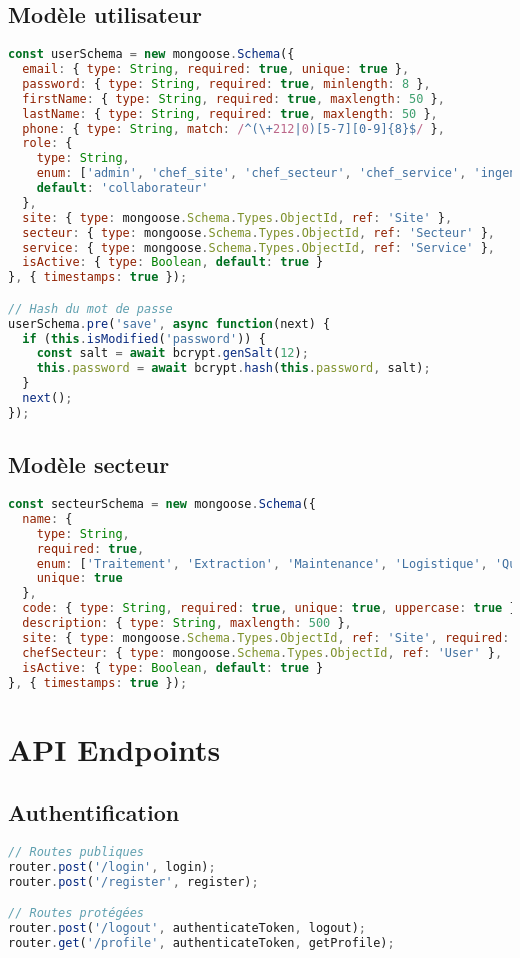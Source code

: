 \subsection{Modèle utilisateur}
\begin{lstlisting}[language=JavaScript, caption=Modèle utilisateur simplifié]
const userSchema = new mongoose.Schema({
  email: { type: String, required: true, unique: true },
  password: { type: String, required: true, minlength: 8 },
  firstName: { type: String, required: true, maxlength: 50 },
  lastName: { type: String, required: true, maxlength: 50 },
  phone: { type: String, match: /^(\+212|0)[5-7][0-9]{8}$/ },
  role: { 
    type: String, 
    enum: ['admin', 'chef_site', 'chef_secteur', 'chef_service', 'ingenieur', 'collaborateur'],
    default: 'collaborateur' 
  },
  site: { type: mongoose.Schema.Types.ObjectId, ref: 'Site' },
  secteur: { type: mongoose.Schema.Types.ObjectId, ref: 'Secteur' },
  service: { type: mongoose.Schema.Types.ObjectId, ref: 'Service' },
  isActive: { type: Boolean, default: true }
}, { timestamps: true });

// Hash du mot de passe
userSchema.pre('save', async function(next) {
  if (this.isModified('password')) {
    const salt = await bcrypt.genSalt(12);
    this.password = await bcrypt.hash(this.password, salt);
  }
  next();
});
\end{lstlisting}

\subsection{Modèle secteur}
\begin{lstlisting}[language=JavaScript, caption=Modèle secteur simplifié]
const secteurSchema = new mongoose.Schema({
  name: { 
    type: String, 
    required: true, 
    enum: ['Traitement', 'Extraction', 'Maintenance', 'Logistique', 'Qualité'],
    unique: true 
  },
  code: { type: String, required: true, unique: true, uppercase: true },
  description: { type: String, maxlength: 500 },
  site: { type: mongoose.Schema.Types.ObjectId, ref: 'Site', required: true },
  chefSecteur: { type: mongoose.Schema.Types.ObjectId, ref: 'User' },
  isActive: { type: Boolean, default: true }
}, { timestamps: true });
\end{lstlisting}

\section{API Endpoints}
\subsection{Authentification}
\begin{lstlisting}[language=JavaScript, caption=Routes d'authentification]
// Routes publiques
router.post('/login', login);
router.post('/register', register);

// Routes protégées
router.post('/logout', authenticateToken, logout);
router.get('/profile', authenticateToken, getProfile);
\end{lstlisting}

